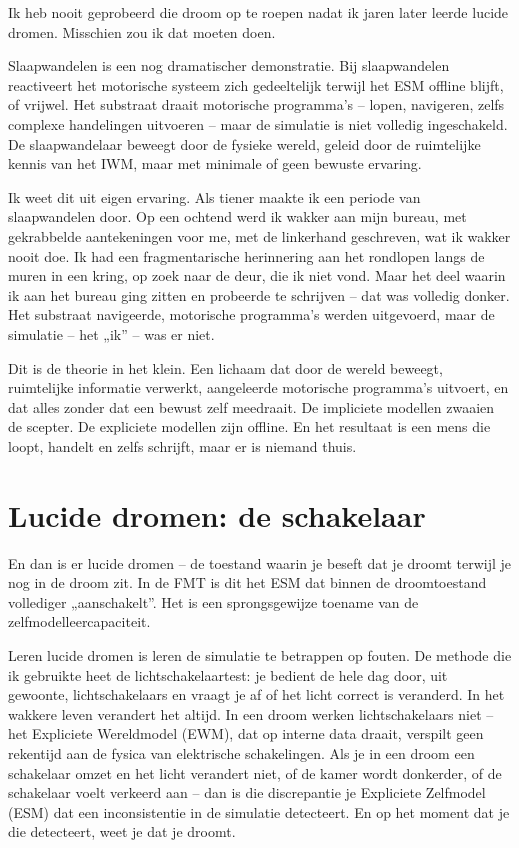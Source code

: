 \documentclass[11pt, twoside, openright]{book}
\begin{document}
Ik heb nooit geprobeerd die droom op te roepen nadat ik jaren later leerde lucide dromen. Misschien zou ik dat moeten doen.

Slaapwandelen is een nog dramatischer demonstratie. Bij slaapwandelen reactiveert het motorische systeem zich gedeeltelijk terwijl het ESM offline blijft, of vrijwel. Het substraat draait motorische programma's -- lopen, navigeren, zelfs complexe handelingen uitvoeren -- maar de simulatie is niet volledig ingeschakeld. De slaapwandelaar beweegt door de fysieke wereld, geleid door de ruimtelijke kennis van het IWM, maar met minimale of geen bewuste ervaring.

Ik weet dit uit eigen ervaring. Als tiener maakte ik een periode van slaapwandelen door. Op een ochtend werd ik wakker aan mijn bureau, met gekrabbelde aantekeningen voor me, met de linkerhand geschreven, wat ik wakker nooit doe. Ik had een fragmentarische herinnering aan het rondlopen langs de muren in een kring, op zoek naar de deur, die ik niet vond. Maar het deel waarin ik aan het bureau ging zitten en probeerde te schrijven -- dat was volledig donker. Het substraat navigeerde, motorische programma's werden uitgevoerd, maar de simulatie -- het „ik” -- was er niet.

Dit is de theorie in het klein. Een lichaam dat door de wereld beweegt, ruimtelijke informatie verwerkt, aangeleerde motorische programma's uitvoert, en dat alles zonder dat een bewust zelf meedraait. De impliciete modellen zwaaien de scepter. De expliciete modellen zijn offline. En het resultaat is een mens die loopt, handelt en zelfs schrijft, maar er is niemand thuis.

\section*{Lucide dromen: de schakelaar}

En dan is er lucide dromen -- de toestand waarin je beseft dat je droomt terwijl je nog in de droom zit. In de FMT is dit het ESM dat binnen de droomtoestand vollediger „aanschakelt”. Het is een sprongsgewijze toename van de zelfmodelleercapaciteit.

Leren lucide dromen is leren de simulatie te betrappen op fouten. De methode die ik gebruikte heet de lichtschakelaartest: je bedient de hele dag door, uit gewoonte, lichtschakelaars en vraagt je af of het licht correct is veranderd. In het wakkere leven verandert het altijd. In een droom werken lichtschakelaars niet -- het Expliciete Wereldmodel (EWM), dat op interne data draait, verspilt geen rekentijd aan de fysica van elektrische schakelingen. Als je in een droom een schakelaar omzet en het licht verandert niet, of de kamer wordt donkerder, of de schakelaar voelt verkeerd aan -- dan is die discrepantie je Expliciete Zelfmodel (ESM) dat een inconsistentie in de simulatie detecteert. En op het moment dat je die detecteert, weet je dat je droomt.
\end{document}
